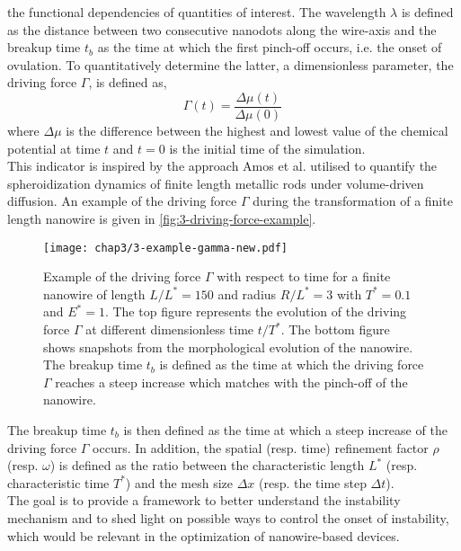 the functional dependencies of quantities of interest. The wavelength $\lambda$ is defined as the distance between two consecutive nanodots along the wire-axis and the breakup time $t_b$ as the time at which the first pinch-off occurs, i.e. the onset of ovulation. To quantitatively determine the latter, a dimensionless parameter, the driving force $\Gamma$, is defined as,
\begin{equation}
    \Gamma(t) = \frac{\Delta \mu(t)}{\Delta \mu(0)}\,
\end{equation}
where $\Delta \mu$ is the difference between the highest and lowest value of the chemical potential at time $t$ and $t=0$ is the initial time of the simulation.\\
This indicator is inspired by the approach Amos et al. \cite{AmosBhattacharyaNestlerAnkit2018,AmosBhattacharyaNestlerAnkit2018} utilised to quantify the spheroidization dynamics of finite length metallic rods under volume-driven diffusion. An example of the driving force $\Gamma$ during the transformation of a finite length nanowire is given in \autoref{fig:3-driving-force-example}.
\begin{figure}[H]
    \centering
    \texttt{[image: chap3/3-example-gamma-new.pdf]}
    \caption{Example of the driving force $\Gamma$ with respect to time for a finite nanowire of length $L/L^* = 150$ and radius $R/L^* = 3$ with $T^*=0.1$ and $E^*=1$. The top figure represents the evolution of the driving force $\Gamma$ at different dimensionless time $t/T^*$. The bottom figure shows snapshots from the morphological evolution of the nanowire. The breakup time $t_b$ is defined as the time at which the driving force $\Gamma$ reaches a steep increase which matches with the pinch-off of the nanowire.}
    \label{fig:3-driving-force-example}
\end{figure}
The breakup time $t_b$ is then defined as the time at which a steep increase of the driving force $\Gamma$ occurs. In addition, the spatial (resp. time) refinement factor $\rho$ (resp. $\omega$) is defined as the ratio between the characteristic length $L^*$ (resp. characteristic time $T^*$) and the mesh size $\Delta x$ (resp. the time step $\Delta t$).\\
The goal is to provide a framework to better understand the instability mechanism and to shed light on possible ways to control the onset of instability, which would be relevant in the optimization of nanowire-based devices.